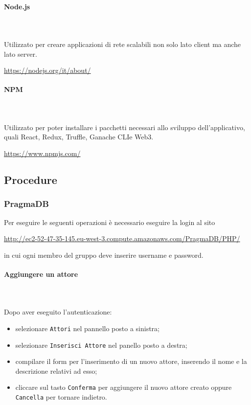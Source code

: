		\paragraph{Node.js} \mbox{}\\ \mbox{}\\
		Utilizzato per creare applicazioni di rete scalabili non solo lato client ma anche lato server.\\
		\centerline{\url{https://nodejs.org/it/about/}}
		
		\paragraph{NPM} \mbox{}\\ \mbox{}\\
		Utilizzato per poter installare i pacchetti necessari allo sviluppo dell'applicativo, quali React\glo, Redux\glo, Truffle\glo, Ganache CLI\glosp e Web3\glo. \\
		\centerline{\url{https://www.npmjs.com/}}
		
	\subsection{Procedure}
		
	\subsubsection{PragmaDB} 
	Per eseguire le seguenti operazioni è necessario eseguire la login al sito \\
	\centerline{\url{http://ec2-52-47-35-145.eu-west-3.compute.amazonaws.com/PragmaDB/PHP/}}
	in cui ogni membro del gruppo deve inserire username e password.
	
	\paragraph{Aggiungere un attore} \mbox{}\\ \mbox{}\\
	Dopo aver eseguito l'autenticazione:
	\begin{itemize}
		\item selezionare \texttt{Attori} nel pannello posto a sinistra;
		\item selezionare \texttt{Inserisci Attore} nel panello posto a destra;
		\item compilare il form per l'inserimento di un nuovo attore, inserendo 
		il nome e la descrizione relativi ad esso;
		\item cliccare sul tasto \texttt{Conferma} per aggiungere il nuovo attore 
		creato oppure \texttt{Cancella} per tornare indietro.	
	\end{itemize}
	
